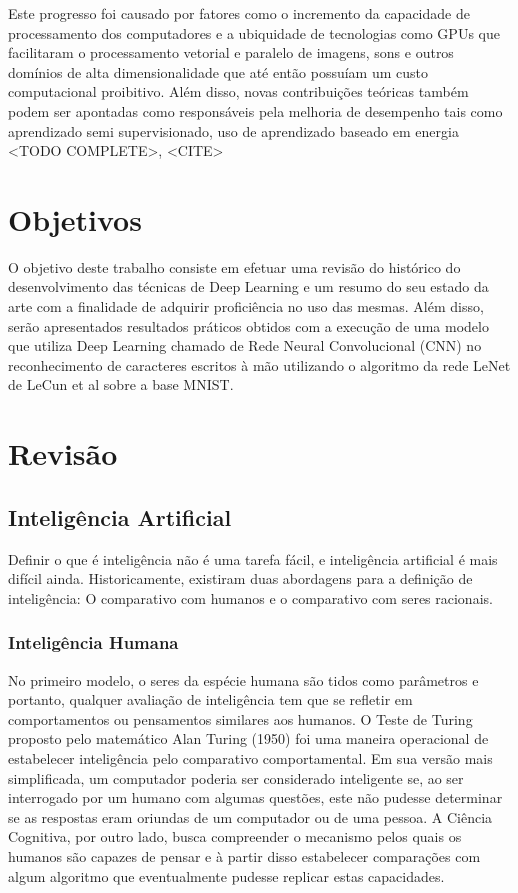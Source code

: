 \documentclass[cic,tc]{iiufrgs}
\begin{document}
Este progresso foi causado por fatores como o incremento da capacidade de
processamento dos computadores e a ubiquidade de tecnologias como GPUs que
facilitaram o processamento vetorial e paralelo de imagens, sons e outros
domínios de alta dimensionalidade que até então possuíam um custo computacional
proibitivo. Além disso, novas contribuições teóricas também podem ser apontadas
como responsáveis pela melhoria de desempenho tais como aprendizado semi
supervisionado, uso de aprendizado baseado em energia <TODO COMPLETE>, <CITE>

\section{Objetivos}

O objetivo deste trabalho consiste em efetuar uma revisão do
histórico do desenvolvimento das técnicas de Deep Learning e um resumo do seu
estado da arte com a finalidade de adquirir proficiência no uso das mesmas.
Além disso, serão apresentados resultados práticos obtidos com a execução de
uma modelo que utiliza Deep Learning chamado de Rede Neural Convolucional
(CNN) no reconhecimento de caracteres escritos à mão utilizando o algoritmo da
rede LeNet de LeCun et al sobre a base MNIST.\@

\section{Revisão}

\subsection{Inteligência Artificial}

Definir o que é inteligência não é uma tarefa fácil, e inteligência artificial
é mais difícil ainda. Historicamente, existiram duas abordagens para a
definição de inteligência: O comparativo com humanos e o comparativo com seres
racionais.

\subsubsection{Inteligência Humana}

No primeiro modelo, o seres da espécie humana são tidos como parâmetros e
portanto, qualquer avaliação de inteligência tem que se refletir em
comportamentos ou pensamentos similares aos humanos. O Teste de Turing proposto
pelo matemático Alan Turing (1950) foi uma maneira operacional de estabelecer
inteligência pelo comparativo comportamental. Em sua versão mais simplificada,
um computador poderia ser considerado inteligente se, ao ser interrogado por um
humano com algumas questões, este não pudesse determinar se as respostas eram
oriundas de um computador ou de uma pessoa. A Ciência Cognitiva, por outro
lado, busca compreender o mecanismo pelos quais os humanos são capazes de
pensar e à partir disso estabelecer comparações com algum algoritmo que
eventualmente pudesse replicar estas capacidades.
\end{document}
